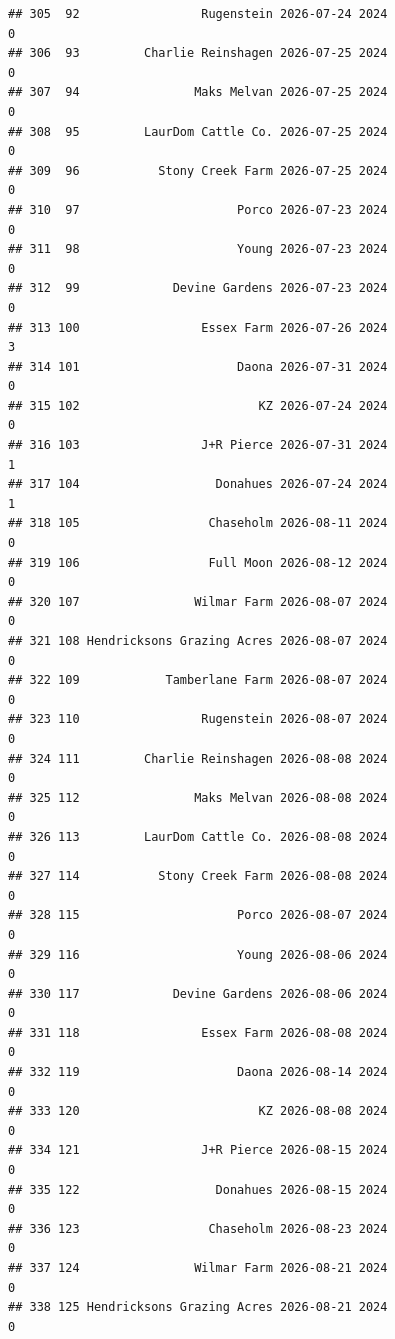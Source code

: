 \documentclass[
]{article}
\begin{document}
\begin{verbatim}
## 305  92                 Rugenstein 2026-07-24 2024                       0
## 306  93         Charlie Reinshagen 2026-07-25 2024                       0
## 307  94                Maks Melvan 2026-07-25 2024                       0
## 308  95         LaurDom Cattle Co. 2026-07-25 2024                       0
## 309  96           Stony Creek Farm 2026-07-25 2024                       0
## 310  97                      Porco 2026-07-23 2024                       0
## 311  98                      Young 2026-07-23 2024                       0
## 312  99             Devine Gardens 2026-07-23 2024                       0
## 313 100                 Essex Farm 2026-07-26 2024                       3
## 314 101                      Daona 2026-07-31 2024                       0
## 315 102                         KZ 2026-07-24 2024                       0
## 316 103                 J+R Pierce 2026-07-31 2024                       1
## 317 104                   Donahues 2026-07-24 2024                       1
## 318 105                  Chaseholm 2026-08-11 2024                       0
## 319 106                  Full Moon 2026-08-12 2024                       0
## 320 107                Wilmar Farm 2026-08-07 2024                       0
## 321 108 Hendricksons Grazing Acres 2026-08-07 2024                       0
## 322 109            Tamberlane Farm 2026-08-07 2024                       0
## 323 110                 Rugenstein 2026-08-07 2024                       0
## 324 111         Charlie Reinshagen 2026-08-08 2024                       0
## 325 112                Maks Melvan 2026-08-08 2024                       0
## 326 113         LaurDom Cattle Co. 2026-08-08 2024                       0
## 327 114           Stony Creek Farm 2026-08-08 2024                       0
## 328 115                      Porco 2026-08-07 2024                       0
## 329 116                      Young 2026-08-06 2024                       0
## 330 117             Devine Gardens 2026-08-06 2024                       0
## 331 118                 Essex Farm 2026-08-08 2024                       0
## 332 119                      Daona 2026-08-14 2024                       0
## 333 120                         KZ 2026-08-08 2024                       0
## 334 121                 J+R Pierce 2026-08-15 2024                       0
## 335 122                   Donahues 2026-08-15 2024                       0
## 336 123                  Chaseholm 2026-08-23 2024                       0
## 337 124                Wilmar Farm 2026-08-21 2024                       0
## 338 125 Hendricksons Grazing Acres 2026-08-21 2024                       0

\end{verbatim}
\end{document}
